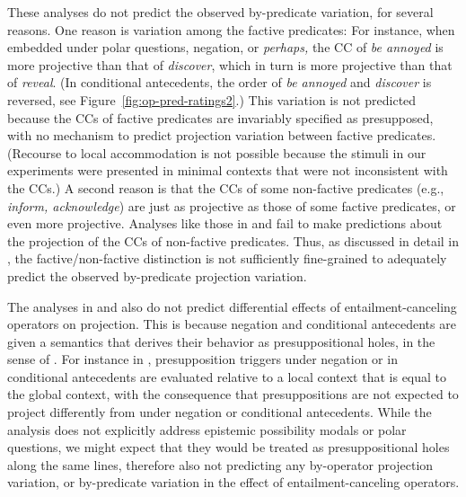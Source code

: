 \documentclass[a4paper,12pt,twoside]{article}
\begin{document}
    These analyses do not predict the observed by-predicate variation, for several reasons. One reason is  variation among the factive predicates: For instance, when embedded under polar questions, negation, or \emph{perhaps,} the CC of \emph{be annoyed} is more projective than that of \emph{discover}, which in turn is more projective than that of \emph{reveal}. (In conditional antecedents, the order of \emph{be annoyed} and \emph{discover} is reversed, see Figure~\ref{fig:op-pred-ratings2}.)
    This variation is not predicted because the CCs of factive predicates are invariably specified as presupposed, with no mechanism to predict projection variation between factive predicates. (Recourse to local accommodation is not possible because the stimuli in our experiments were presented in minimal contexts that were not inconsistent with the CCs.)  A second reason is that the CCs of some non-factive predicates (e.g., \emph{inform, acknowledge}) are just as projective as those of some factive predicates, or even more projective. Analyses like those in \citealt{heim_projection_1983} and \citealt{van_der_sandt_presupposition_1992} fail to make predictions about the projection of the CCs of non-factive predicates. Thus, as discussed in detail in \citealt{degen_are_2022}, the factive/non-factive distinction is not sufficiently fine-grained to adequately predict the observed by-predicate projection variation.

    The analyses in \citealt{heim_projection_1983} and \citealt{van_der_sandt_presupposition_1992} also do not predict differential effects of entailment-canceling operators on projection. This is because negation and conditional antecedents are given a semantics that derives their behavior as presuppositional holes, in the sense of \citealt{karttunen_observations_1971}. For instance in \citealt{heim_projection_1983}, presupposition triggers under negation or in conditional antecedents are evaluated relative to a local context that is equal to the global context, with the consequence that presuppositions are not expected to project differently from under negation or conditional antecedents. While the analysis does not explicitly address epistemic possibility modals or polar questions, we might expect that they would be treated as presuppositional holes along the same lines, therefore also not predicting any by-operator projection variation, or by-predicate variation in the effect of entailment-canceling operators.
		
\end{document}
